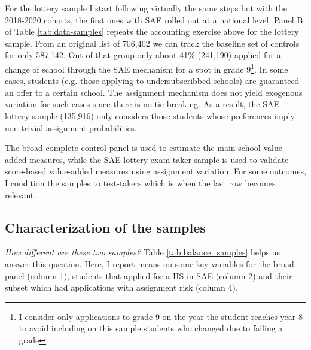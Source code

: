 \documentclass[a4paper, article, english, oneside, unknownkeysallowed, 12pt]{memoir}
\begin{document}
For the lottery sample I start following virtually the same steps but with the 2018-2020 cohorts, the first ones with SAE rolled out at a national level.
Panel B of Table \ref{tab:data-samples} repeats the accounting exercise above for the lottery sample. 
From an original list of 706,402 we can track the baseline set of controls for only 587,142. 
Out of that group only about 41\% (241,190) applied for a change of school through the SAE mechanism for a spot in grade 9\footnote{I consider only applications to grade 9 on the year the student reaches year 8 to avoid including on this sample students who changed due to failing a grade}.
In some cases, students (e.g. those applying to undersubscribbed schools) are guaranteed an offer to a certain school. 
The assignment mechanism does not yield exogenous variation for such cases since there is no tie-breaking.
As a result, the SAE lottery sample (135,916) only considers those students whose preferences imply non-trivial assignment probabilities. 





The broad complete-control panel is used to estimate the main school value-added measures, while the SAE lottery exam-taker sample is used to validate score-based value-added measures using assignment variation.
For some outcomes, I condition the samples to test-takers which is when the last row becomes relevant.

\subsection{Characterization of the samples}

\textit{How different are these two samples?} Table \ref{tab:balance_samples} helps us answer this question. 
Here, I report means on some key variables for the broad panel (column 1), 
students that applied for a HS in SAE (column 2) and their subset which had applications with assignment risk (column 4).
\end{document}
